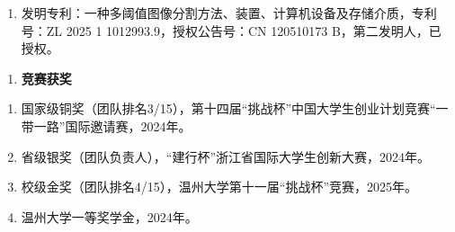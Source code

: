\documentclass{wzuthesis} %
\begin{document}
    \begin{enumerate}
        \renewcommand{\labelenumi}{[\arabic{enumi}]}
        \setlength{\itemindent}{0em}
        \setlength{\labelsep}{0.5em}

        \item 发明专利：一种多阈值图像分割方法、装置、计算机设备及存储介质，专利号：ZL 2025 1 1012993.9，授权公告号：CN 120510173 B，第二发明人，已授权。
    \end{enumerate}

    \begin{enumerate}[label=\arabic*., start=3]
        \item \textbf{竞赛获奖}
    \end{enumerate}

    \begin{enumerate}
        \renewcommand{\labelenumi}{[\arabic{enumi}]}
        \setlength{\itemindent}{0em}
        \setlength{\labelsep}{0.5em}

        \item 国家级铜奖（团队排名3/15），第十四届“挑战杯”中国大学生创业计划竞赛“一带一路”国际邀请赛，2024年。
        \item 省级银奖（团队负责人），“建行杯”浙江省国际大学生创新大赛，2024年。
        \item 校级金奖（团队排名4/15），温州大学第十一届“挑战杯”竞赛，2025年。
        \item 温州大学一等奖学金，2024年。
    \end{enumerate}
\fi

\end{document}
